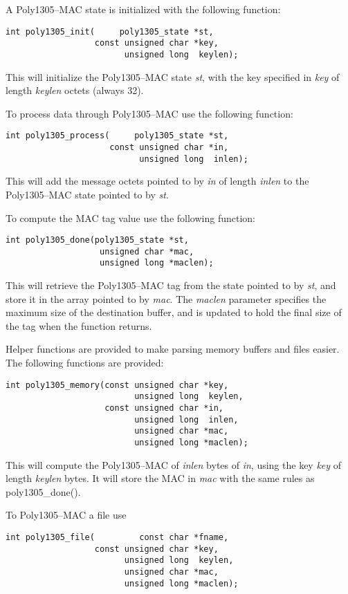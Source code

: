 \documentclass[synpaper]{book}
\begin{document}
A Poly1305--MAC state is initialized with the following function:
\begin{verbatim}
int poly1305_init(     poly1305_state *st,
                  const unsigned char *key,
                        unsigned long  keylen);
\end{verbatim}
This will initialize the Poly1305--MAC state \textit{st}, with the key specified in \textit{key} of length \textit{keylen} octets (always 32).

To process data through Poly1305--MAC use the following function:
\begin{verbatim}
int poly1305_process(     poly1305_state *st,
                     const unsigned char *in,
                           unsigned long  inlen);
\end{verbatim}

This will add the message octets pointed to by \textit{in} of length \textit{inlen} to the Poly1305--MAC state pointed to by \textit{st}.

To compute the MAC tag value use the following function:
\begin{verbatim}
int poly1305_done(poly1305_state *st,
                   unsigned char *mac,
                   unsigned long *maclen);
\end{verbatim}

This will retrieve the Poly1305--MAC tag from the state pointed to by \textit{st}, and store it in the array pointed to by \textit{mac}.
The \textit{maclen} parameter specifies the maximum size of the destination buffer, and is updated to hold the final size of the tag when
the function returns.

Helper functions are provided to make parsing memory buffers and files easier. The following functions are provided:
\begin{verbatim}
int poly1305_memory(const unsigned char *key,
                          unsigned long  keylen,
                    const unsigned char *in,
                          unsigned long  inlen,
                          unsigned char *mac,
                          unsigned long *maclen);
\end{verbatim}
This will compute the Poly1305--MAC of \textit{inlen} bytes of \textit{in}, using the key \textit{key} of length \textit{keylen} bytes.
It will store the MAC in \textit{mac} with the same rules as poly1305\_done().

To Poly1305--MAC a file use
\begin{verbatim}
int poly1305_file(         const char *fname,
                  const unsigned char *key,
                        unsigned long  keylen,
                        unsigned char *mac,
                        unsigned long *maclen);
\end{verbatim}
\end{document}
